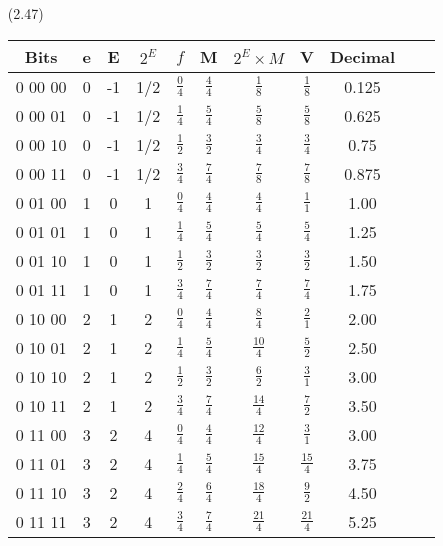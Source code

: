 \documentclass[11pt]{article}
\begin{document}
\begin{enumerate}
        \item[(2.47)]
            \begin{tabular}{||c | c | c | c | c | c | c | c | c | c | c||} 
            \hline
            Bits & e & E & $2^E$ & $f$ & M & $2^E \times M$ & V & Decimal \\ [0.5ex] 
            \hline\hline
            0 00 00 & 0 & -1 & 1/2 & $\frac{0}{4}$ & $\frac{4}{4}$ & $\frac{1}{8}$ & $\frac{1}{8}$ & 0.125 \\
            \hline
            0 00 01 & 0 & -1 & 1/2 & $\frac{1}{4}$ & $\frac{5}{4}$ & $\frac{5}{8}$ & $\frac{5}{8}$ & 0.625 \\
            \hline
            0 00 10 & 0 & -1 & 1/2 & $\frac{1}{2}$ & $\frac{3}{2}$ & $\frac{3}{4}$ & $\frac{3}{4}$ & 0.75 \\
            \hline
            0 00 11 & 0 & -1 & 1/2 & $\frac{3}{4}$ & $\frac{7}{4}$ & $\frac{7}{8}$ & $\frac{7}{8}$ & 0.875 \\
            \hline
            0 01 00 & 1 & 0 & 1 & $\frac{0}{4}$ & $\frac{4}{4}$ & $\frac{4}{4}$ & $\frac{1}{1}$ & 1.00 \\
            \hline
            0 01 01 & 1 & 0 & 1 & $\frac{1}{4}$ & $\frac{5}{4}$ & $\frac{5}{4}$ & $\frac{5}{4}$ & 1.25 \\
            \hline
            0 01 10 & 1 & 0 & 1 & $\frac{1}{2}$ & $\frac{3}{2}$ & $\frac{3}{2}$ & $\frac{3}{2}$ & 1.50 \\
            \hline
            0 01 11 & 1 & 0 & 1 & $\frac{3}{4}$ & $\frac{7}{4}$ & $\frac{7}{4}$ & $\frac{7}{4}$ & 1.75 \\
            \hline
            0 10 00 & 2 & 1 & 2 & $\frac{0}{4}$ & $\frac{4}{4}$ & $\frac{8}{4}$ & $\frac{2}{1}$ & 2.00 \\
            \hline
            0 10 01 & 2 & 1 & 2 & $\frac{1}{4}$ & $\frac{5}{4}$ & $\frac{10}{4}$ & $\frac{5}{2}$ & 2.50 \\
            \hline
            0 10 10 & 2 & 1 & 2 & $\frac{1}{2}$ & $\frac{3}{2}$ & $\frac{6}{2}$ & $\frac{3}{1}$ & 3.00 \\
            \hline
            0 10 11 & 2 & 1 & 2 & $\frac{3}{4}$ & $\frac{7}{4}$ & $\frac{14}{4}$ & $\frac{7}{2}$ & 3.50 \\
            \hline
            0 11 00 & 3 & 2 & 4 & $\frac{0}{4}$ & $\frac{4}{4}$ & $\frac{12}{4}$ & $\frac{3}{1}$ & 3.00 \\
            \hline
            0 11 01 & 3 & 2 & 4 & $\frac{1}{4}$ & $\frac{5}{4}$ & $\frac{15}{4}$ & $\frac{15}{4}$ & 3.75 \\
            \hline
            0 11 10 & 3 & 2 & 4 & $\frac{2}{4}$ & $\frac{6}{4}$ & $\frac{18}{4}$ & $\frac{9}{2}$ & 4.50 \\
            \hline
            0 11 11 & 3 & 2 & 4 & $\frac{3}{4}$ & $\frac{7}{4}$ & $\frac{21}{4}$ & $\frac{21}{4}$ & 5.25 \\
            \hline
            \end{tabular}      
    \end{enumerate}
\end{document}
